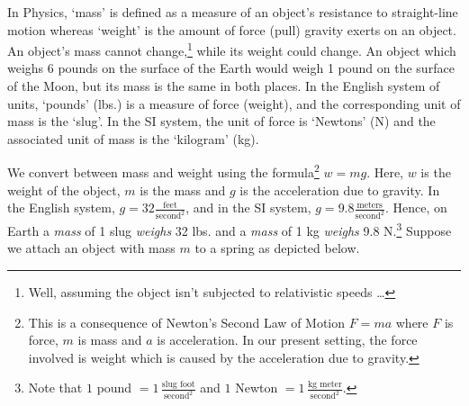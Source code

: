 \smallskip

In Physics, `mass' is defined as a measure of an object's resistance to straight-line motion whereas `weight' is the amount of force (pull) gravity exerts on an object.  An object's mass cannot change,\footnote{Well, assuming the object isn't subjected to relativistic speeds \dots} while its weight could change.  An object which weighs 6 pounds on the surface of the Earth would weigh 1 pound on the surface of the Moon, but its mass is the same in both places. In the English system of units, `pounds' (lbs.) is a measure of force (weight), and the corresponding unit of mass is the `slug'. In the SI system, the unit of force is `Newtons' (N) and the associated unit of mass is the `kilogram' (kg). 

\smallskip

We convert between mass and weight using the formula\footnote{This is a consequence of Newton's Second Law of Motion $F = ma$ where $F$ is force, $m$ is mass and $a$ is acceleration.  In our present setting, the force involved is weight which is caused by the acceleration due to gravity.} $w = mg$.   Here, $w$ is the weight of the object, $m$ is the mass and $g$ is the acceleration due to gravity.  In the English system, $g = 32 \frac{\text{feet}}{\text{second}^2}$, and in the SI system, $g = 9.8\frac{\text{meters}}{\text{second}^2}$. Hence, on Earth a \textit{mass} of 1 slug \textit{weighs} 32 lbs. and a \textit{mass} of 1 kg \textit{weighs} 9.8 N.\footnote{Note that $1$ pound $ = 1 \, \frac{\text{slug foot}}{\text{second}^2}$ and $1$ Newton $ = 1 \, \frac{\text{kg meter}}{\text{second}^2}$.}    Suppose we attach an object with mass $m$ to a spring as depicted below. 

